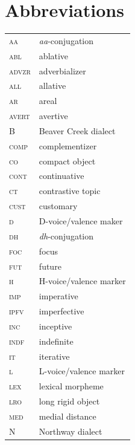 \documentclass[output=paper,colorlinks,citecolor=brown
]{langscibook}
\begin{document}
\section*{Abbreviations}

\begin{tabularx}{.5\textwidth}{@{}lQ@{}}
\textsc{aa} & \textit{aa}-conjugation \\
\textsc{abl} & ablative \\
\textsc{advzr} & adverbializer \\
\textsc{all} & allative \\
\textsc{ar} & areal \\
\textsc{avert} & avertive \\
B & Beaver Creek dialect \\
\textsc{comp} & complementizer \\
\textsc{co} & compact object \\
\textsc{cont} & continuative \\
\textsc{ct} & contrastive topic \\
\textsc{cust} & customary \\
\textsc{d} & D-voice/valence maker \\
\textsc{dh} & \textit{dh}-conjugation \\
\textsc{foc} & focus \\
\textsc{fut} & future \\
\textsc{h} & H-voice/valence marker \\
\textsc{imp} & imperative \\
\textsc{ipfv} & imperfective \\
\textsc{inc} & inceptive \\
\textsc{indf} & indefinite \\
\textsc{it} & iterative \\
\textsc{l} & L-voice/valence marker \\
\textsc{lex} & lexical morpheme \\
\textsc{lro} & long rigid object \\
\textsc{med} & medial distance \\
N & Northway dialect \end{tabularx}%
\end{document}
